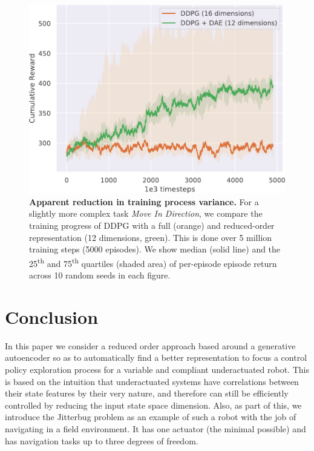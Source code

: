 \documentclass{article}
\begin{document}
\begin{figure}[t]
    \centering
    \includegraphics[width=.9\linewidth]{denoising_autoencoder25_75}
    \caption{
        \textbf{Apparent reduction in training process variance.}
        For a slightly more complex task \textit{Move In Direction}, we compare the training progress of DDPG with a full (orange) and reduced-order representation (12 dimensions, green).
        This is done over 5 million training steps (5000 episodes).
        We show median (solid line) and the 25\textsuperscript{th} and 75\textsuperscript{th} quartiles (shaded area) of per-episode episode return across 10 random seeds in each figure.
    }\vspace*{-12pt}
    \label{fig:ae-lowvar}
\end{figure}


\section{Conclusion}

In this paper we consider a reduced order approach based around a generative autoencoder so as to automatically find a better representation to focus a control policy exploration process for a variable and compliant underactuated robot.
This is based on the intuition that underactuated systems have correlations between their state features by their very nature, and therefore can still be efficiently controlled by reducing the input state space dimension.
Also, as part of this, we introduce the Jitterbug problem as an example of such a robot with the job of navigating in a field environment.
It has one actuator (the minimal possible) and has navigation tasks up to three degrees of freedom.
\end{document}
